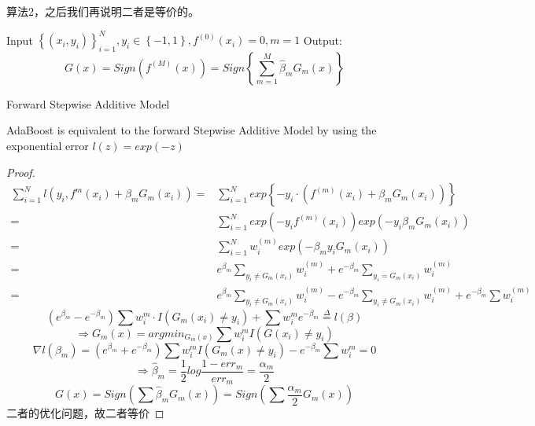 \documentclass[lang=cn,11pt,a4paper]{elegantpaper}
\theoremstyle{plain}
\theoremstyle{remark}
\begin{document}

 算法2，之后我们再说明二者是等价的。

\begin{algorithm}[H]
    \SetAlgoLined
     Input $\left\{ (x_i,y_i) \right\}_{i=1}^N,y_i \in \left\{ -1,1 \right\},f^{(0)}(x_i)=0,m =1$\;
     Output: 
     $$ G(x) = Sign (f^{(M)}(x)) = Sign\left\{ \sum_{m=1}^M \hat{\beta}_m G_m(x) \right\}  $$ 
     \caption{Forward Stepwise Additive Model}
    \end{algorithm}

\newpage
\begin{theorem}
    AdaBoost is equivalent to the forward Stepwise Additive Model by using the exponential error $l(z) = exp(-z)$ 
\end{theorem}

\begin{proof}
    \begin{equation*}
        \begin{aligned}
            \sum_{i=1}^N l(y_i,f^{m}(x_i)+\beta_m G_m(x_i)) =& \sum_{i=1}^N exp \left\{-y_i\cdot(f^{(m)}(x_i)+\beta_mG_m(x_i))  \right\} \\
             =& \sum_{i=1}^{N} exp(-y_if^{(m)}(x_i))exp(-y_i\beta_m G_m(x_i))\\
             =& \sum_{i=1}^{N} w_i^{(m)}exp(-\beta_m y_i G_m(x_i))\\
             =&e^{\beta_m} \sum_{y_i\ne G_m(x_i)}w_i^{(m)}+e^{-\beta_m} \sum_{y_i =  G_m(x_i)}w_i^{(m)}\\
             =&e^{\beta_m} \sum_{y_i\ne G_m(x_i)}w_i^{(m)}-e^{-\beta_m} \sum_{y_i\ne G_m(x_i)}w_i^{(m)}+e^{-\beta_m} \sum w_i^{(m)}
        \end{aligned}
    \end{equation*}
$$ (e^{\beta_m}-e^{-\beta_m}) \sum w_i^m \cdot I(G_m(x_i)\ne y_i) + \sum w_i^m e^{-\beta_m} \overset{\Delta}{=}l(\beta)$$
$$ \Rightarrow G_m(x) = argmin_{G_m(x)} \sum w_i^m I(G(x_i)\ne y_i) $$
$$ \nabla{l(\beta_m)} = (e^{\beta_m}+e^{-\beta_m})\sum w_i^m I(G_m(x)\ne y_i)-e^{-\beta_m} \sum w_i^m = 0$$
$$\Rightarrow \hat{\beta}_m = \frac{1}{2} log\frac{1-err_m}{err_m} = \frac{\alpha_m}{2} $$
$$ G(x) = Sign(\sum \hat{\beta}_m G_m(x)) = Sign(\sum \frac{\alpha_m}{2}G_m(x)) $$
二者的优化问题，故二者等价
\end{proof}
\end{document}
